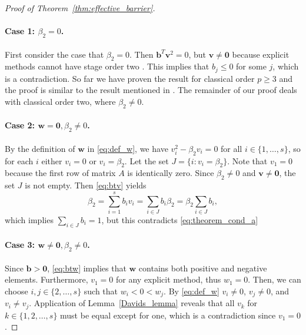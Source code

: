\begin{proof}[Proof of Theorem~\ref{thm:effective_barrier}]
	\paragraph{Case 1: $\beta_2 = 0$.}
	First consider the case that $\beta_2 = 0$. 
	Then $\bm{b}^T\bm{v}^2 = 0$, but $\bm{v }\neq \bm{0}$ because explicit methods
	cannot have stage order two \cite{Ruuth2002}. This implies that $b_j \leq 0$ 
	for some $j$, which is a contradiction.
	So far we have proven the result for classical order $p \ge 3$ 
	and the proof is similar to the result mentioned in \cite{Ruuth2002}. 
	The remainder of our proof deals with classical order two, 
	where $\beta_2 \neq 0$.

	\paragraph{Case 2: $\bm{w} = \bm{0}, \beta_2\ne0$.}
	By the definition of $\bm{w}$ in \eqref{eq:def_w}, we have $v_i^2 - \beta_2 v_i = 0$ 
	for all $i \in \{1, \dots, s\}$, 	so for each $i$ either $v_i = 0$ or $v_i = \beta_2$.
	Let the set $J = \{i : v_i = \beta_2\}$. 
	Note that $v_1 = 0$ because the first row of matrix $A$ is identically zero.
	Since $\beta_2 \neq 0$ and $ \bm{v} \neq \bm{0}$, the set $J$ is not empty.
	Then \eqref{eq:btv} yields 
	\begin{equation*}
            \beta_2 = \sum_{i=1}^s b_i v_i = \sum_{i \in J}b_i\beta_2 = \beta_2\sum_{i \in J}b_i,
	\end{equation*}
        which implies $\sum_{i\in J} b_i = 1$, but this contradicts \eqref{eq:theorem_cond_a}

	\paragraph{Case 3: $\bm{w} \neq \bm{0}, \beta_2\ne0$.}
	Since $\bm{b} > \bm{0}$, \eqref{eq:btw} implies that $\bm{w}$ contains both positive 
	and negative elements. 
	Furthermore, $v_1=0$ for any explicit method, thus $w_1=0$.
	Then, we can choose $i, j \in \{2, \dots, s\}$ such that $w_i < 0 < w_j$.
     By \eqref{eq:def_w} $v_i\ne 0$, $v_j\ne 0$, and $v_i\ne v_j$. 
     Application of Lemma~\ref{Davids_lemma} reveals that all $v_k$ for 
     $k \in\{1,2,\dots,s\}$ must be equal except for one, which is a contradiction
     since $v_1 = 0$.

\end{proof}
